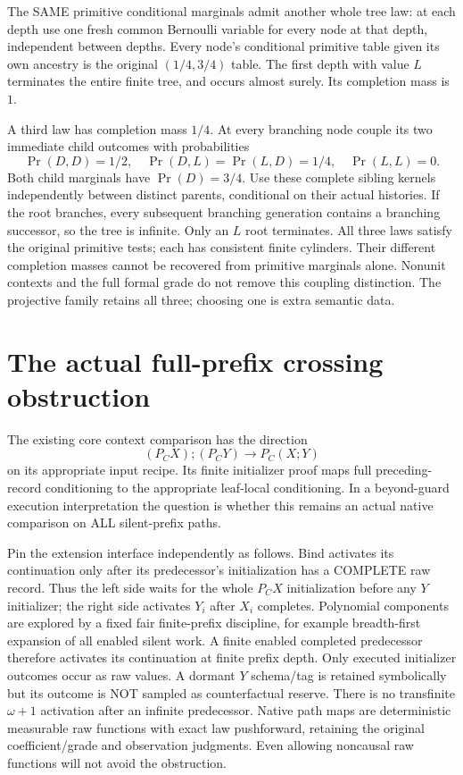 \documentclass[11pt]{article}
\begin{document}
The SAME primitive conditional marginals admit another whole tree law: at each depth use one fresh common Bernoulli variable for every node at that depth, independent between depths. Every node's conditional primitive table given its own ancestry is the original $(1/4,3/4)$ table. The first depth with value $L$ terminates the entire finite tree, and occurs almost surely. Its completion mass is $1$.

A third law has completion mass $1/4$. At every branching node couple its two immediate child outcomes with probabilities
\[
    \Pr(D,D)=1/2,\quad\Pr(D,L)=\Pr(L,D)=1/4,\quad\Pr(L,L)=0.
\]
Both child marginals have $\Pr(D)=3/4$. Use these complete sibling kernels independently between distinct parents, conditional on their actual histories. If the root branches, every subsequent branching generation contains a branching successor, so the tree is infinite. Only an $L$ root terminates. All three laws satisfy the original primitive tests; each has consistent finite cylinders. Their different completion masses cannot be recovered from primitive marginals alone. Nonunit contexts and the full formal grade do not remove this coupling distinction. The projective family retains all three; choosing one is extra semantic data.

\section{The actual full-prefix crossing obstruction}
The existing core context comparison has the direction
\[
       (P_C X);(P_C Y)\longrightarrow P_C(X;Y)
\]
on its appropriate input recipe. Its finite initializer proof maps full preceding-record conditioning to the appropriate leaf-local conditioning. In a beyond-guard execution interpretation the question is whether this remains an actual native comparison on ALL silent-prefix paths.

Pin the extension interface independently as follows. Bind activates its continuation only after its predecessor's initialization has a COMPLETE raw record. Thus the left side waits for the whole $P_CX$ initialization before any $Y$ initializer; the right side activates $Y_i$ after $X_i$ completes. Polynomial components are explored by a fixed fair finite-prefix discipline, for example breadth-first expansion of all enabled silent work. A finite enabled completed predecessor therefore activates its continuation at finite prefix depth. Only executed initializer outcomes occur as raw values. A dormant $Y$ schema/tag is retained symbolically but its outcome is NOT sampled as counterfactual reserve. There is no transfinite $\omega+1$ activation after an infinite predecessor. Native path maps are deterministic measurable raw functions with exact law pushforward, retaining the original coefficient/grade and observation judgments. Even allowing noncausal raw functions will not avoid the obstruction.
\end{document}
